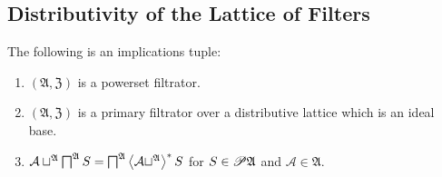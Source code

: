 \subsection{Distributivity of the Lattice of Filters}
\begin{thm}
\label{f-inf-assc}The following is an implications tuple:
\begin{enumerate}
\item \label{inf-assc-p}$(\mathfrak{A},\mathfrak{Z})$ is a powerset filtrator.
\item \label{inf-assc-prim}$(\mathfrak{A},\mathfrak{Z})$ is a primary
filtrator over a distributive lattice which is an ideal
base.
\item \label{inf-assc-conc}$\mathcal{A}\sqcup^{\mathfrak{A}}\bigsqcap^{\mathfrak{A}}S=\bigsqcap^{\mathfrak{A}}\left\langle \mathcal{A}\sqcup^{\mathfrak{A}}\right\rangle ^{\ast}S$
for $S\in\mathscr{P}\mathfrak{A}$ and $\mathcal{A}\in\mathfrak{A}$.
\end{enumerate}
\end{thm}
